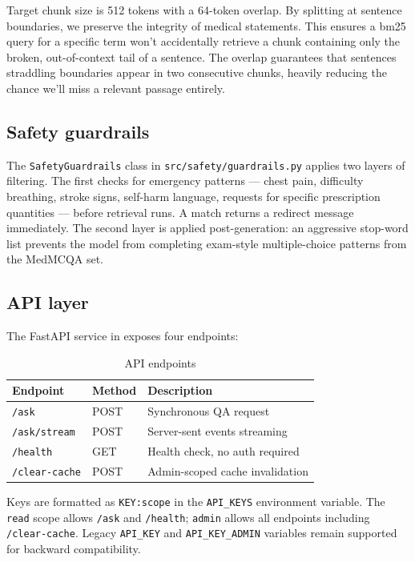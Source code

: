 Target chunk size is 512 tokens with a 64-token overlap. By splitting at sentence boundaries, we preserve the integrity of medical statements. This ensures a \ac{bm25} query for a specific term won't accidentally retrieve a chunk containing only the broken, out-of-context tail of a sentence. The overlap guarantees that sentences straddling boundaries appear in two consecutive chunks, heavily reducing the chance we'll miss a relevant passage entirely.

\subsection{Safety guardrails}

The \texttt{SafetyGuardrails} class in \texttt{src/safety/guardrails.py} applies two layers of filtering. The first checks for emergency patterns --- chest pain, difficulty breathing, stroke signs, self-harm language, requests for specific prescription quantities --- before retrieval runs. A match returns a redirect message immediately. The second layer is applied post-generation: an aggressive stop-word list prevents the model from completing exam-style multiple-choice patterns from the MedMCQA set.

\subsection{API layer}

The FastAPI service in  exposes four endpoints:

\begin{table}[htbp]
\centering
\caption{API endpoints}
\renewcommand{\arraystretch}{1.3}
\begin{tabular}{|l|l|l|}
\hline
\textbf{Endpoint} & \textbf{Method} & \textbf{Description} \\
\hline
\texttt{/ask} & POST & Synchronous QA request \\
\texttt{/ask/stream} & POST & Server-sent events streaming \\
\texttt{/health} & GET & Health check, no auth required \\
\texttt{/clear-cache} & POST & Admin-scoped cache invalidation \\
\hline
\end{tabular}
\end{table}

Keys are formatted as \texttt{KEY:scope} in the \texttt{API\_KEYS} environment variable. The \texttt{read} scope allows \texttt{/ask} and \texttt{/health}; \texttt{admin} allows all endpoints including \texttt{/clear-cache}. Legacy \texttt{API\_KEY} and \texttt{API\_KEY\_ADMIN} variables remain supported for backward compatibility.
